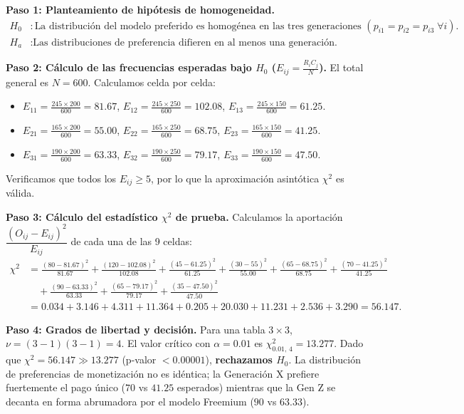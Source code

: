 \begin{solproblema}
	\textbf{Paso 1: Planteamiento de hipótesis de homogeneidad.}
	\begin{align}
		H_0&: \text{La distribución del modelo preferido es homogénea en las tres generaciones } (p_{i1}=p_{i2}=p_{i3} \; \forall i). \\
		H_a&: \text{Las distribuciones de preferencia difieren en al menos una generación.}
	\end{align}
	
	\textbf{Paso 2: Cálculo de las frecuencias esperadas bajo $H_0$ ($E_{ij} = \frac{R_i C_j}{N}$).}
	El total general es $N = 600$. Calculamos celda por celda:
	\begin{itemize}
		\item $E_{11} = \frac{245 \times 200}{600} = 81.67$, \quad $E_{12} = \frac{245 \times 250}{600} = 102.08$, \quad $E_{13} = \frac{245 \times 150}{600} = 61.25$.
		\item $E_{21} = \frac{165 \times 200}{600} = 55.00$, \quad $E_{22} = \frac{165 \times 250}{600} = 68.75$, \quad $E_{23} = \frac{165 \times 150}{600} = 41.25$.
		\item $E_{31} = \frac{190 \times 200}{600} = 63.33$, \quad $E_{32} = \frac{190 \times 250}{600} = 79.17$, \quad $E_{33} = \frac{190 \times 150}{600} = 47.50$.
	\end{itemize}
	Verificamos que todos los $E_{ij} \geq 5$, por lo que la aproximación asintótica $\chi^2$ es válida.
	
	\textbf{Paso 3: Cálculo del estadístico $\chi^2$ de prueba.}
	Calculamos la aportación $\dfrac{(O_{ij}-E_{ij})^2}{E_{ij}}$ de cada una de las 9 celdas:
	\begin{align}
		\chi^2 &= \frac{(80-81.67)^2}{81.67} + \frac{(120-102.08)^2}{102.08} + \frac{(45-61.25)^2}{61.25} + \frac{(30-55)^2}{55.00} + \frac{(65-68.75)^2}{68.75} + \frac{(70-41.25)^2}{41.25} \nonumber \\
		&\quad + \frac{(90-63.33)^2}{63.33} + \frac{(65-79.17)^2}{79.17} + \frac{(35-47.50)^2}{47.50} \\
		&= 0.034 + 3.146 + 4.311 + 11.364 + 0.205 + 20.030 + 11.231 + 2.536 + 3.290 = 56.147.
	\end{align}
	
	\textbf{Paso 4: Grados de libertad y decisión.}
	Para una tabla $3 \times 3$, $\nu = (3-1)(3-1) = 4$. El valor crítico con $\alpha = 0.01$ es $\chi^2_{0.01, \, 4} = 13.277$.
	Dado que $\chi^2 = 56.147 \gg 13.277$ (p-valor $< 0.00001$), \textbf{rechazamos $H_0$}. La distribución de preferencias de monetización no es idéntica; la Generación X prefiere fuertemente el pago único ($70$ vs $41.25$ esperados) mientras que la Gen Z se decanta en forma abrumadora por el modelo Freemium ($90$ vs $63.33$).
\end{solproblema}

